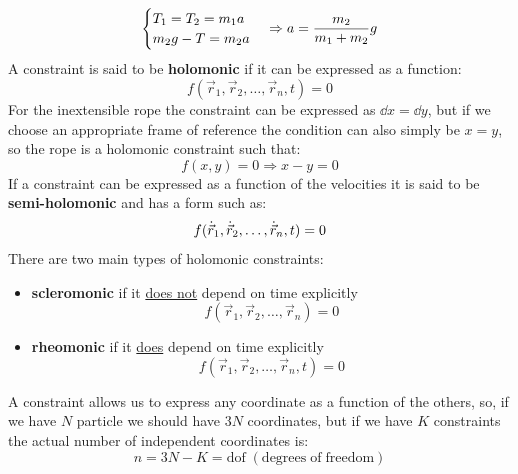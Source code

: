 \begin{equation}
    \centering
\begin{cases}
T_1=T_2=m_1a \\
m_2g -T =m_2a \\
\end{cases} \Rightarrow a = \dfrac{m_2}{m_1+m_2}g
\end{equation}
A constraint is said to be \textbf{holomonic} if it can be expressed as a function:
\begin{equation}
    f(\vec{r}_1,\vec{r}_2,\dots,\vec{r}_n,t) = 0
\end{equation}
For the inextensible rope the constraint can be expressed as $\dd{x}=\dd{y}$, but if we choose an appropriate frame of reference the condition can also simply be $x=y$, so the rope is a holomonic constraint such that:
\begin{equation}
    f(x,y)=0 \Rightarrow x-y=0
\end{equation}
If a constraint can be expressed as a function of the velocities it is said to be \textbf{semi-holomonic} and has a form such as:
\begin{equation}
    f(\dot{\vec{r}}_1,\dot{\vec{r}}_2,\dots,\dot{\vec{r}}_n,t) = 0
\end{equation}
There are two main types of holomonic constraints:
\begin{itemize}
    \item \textbf{scleromonic} if it \underline{does not} depend on time explicitly \[f(\vec{r}_1,\vec{r}_2,\dots,\vec{r}_n) = 0\]
    \item \textbf{rheomonic} if it \underline{does} depend on time explicitly \[f(\vec{r}_1,\vec{r}_2,\dots,\vec{r}_n,t) = 0\]
\end{itemize}
A constraint allows us to express any coordinate as a function of the others, so, if we have $N$ particle we should have $3N$ coordinates, but if we have $K$ constraints the actual number of independent coordinates is:
\begin{equation}
    n = 3N-K = \mathrm{dof\;(degrees\;of\;freedom)}
\end{equation}
